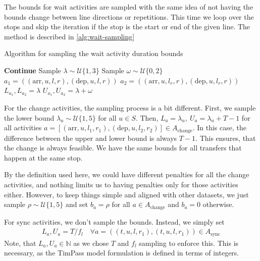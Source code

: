\documentclass[english, 12pt, a4paper, sci, utf8, a-2b, online]{aaltothesis}
\newcommand{\N}{\mathbb{N}}
\newcommand{\Async}{A_\text{sync}}
\newcommand{\unif}[1]{\mathcal{U}\{#1\}}
\begin{document}
The bounds for wait activities are sampled with the same idea of not having the bounds change between line directions or repetitions. This time we loop over the stops and skip the iteration if the stop is the start or end of the given line. The method is described in \cref{alg:wait-sampling}

\begin{algorithm}

    \caption{Algorithm for sampling the wait activity duration bounds}
    \label{alg:wait-sampling}
    \begin{algorithmic}
                    \State \textbf{Continue}
                \EndIf
                \State Sample $\lambda \sim \unif{1, 3}$ 
                \State Sample $\omega \sim \unif{0, 2}$ 
                    \State $a_1 = ((\text{arr}, u, l, r), (\text{dep}, u, l, r))$ 
                    \State $a_2 = ((\text{arr}, u, l_r, r), (\text{dep}, u, l_r, r))$ 
                    \State $L_{a_1}, L_{a_2} = \lambda$
                    \State $U_{a_1}, U_{a_2} = \lambda + \omega$
                \EndFor
            \EndFor
        \EndFor
    \end{algorithmic}
    
\end{algorithm}

For the change activities, the sampling process is a bit different. First, we sample the lower bound $\lambda_u \sim \unif{1, 5}$ for all $ u \in S$. Then, $L_a = \lambda_u,\ U_a = \lambda_u + T - 1$ for all activities $a = [(\text{arr}, u, l_1, r_1), (\text{dep}, u, l_2, r_2)] \in A_\text{change}$. In this case, the difference between the upper and lower bound is always $T-1$. This ensures, that the change is always feasible. We have the same bounds for all transfers that happen at the same stop.

By the definition used here, we could have different penalties for all the change activities, and nothing limits us to having penalties only for those activities either. However, to keep things simple and aligned with other datasets, we just sample $\rho \sim \unif{1, 5}$ and set $b_a = \rho$ for all $a \in A_\text{change}$ and $b_a = 0$ otherwise.

For sync activities, we don't sample the bounds. Instead, we simply set
\begin{align}
    L_a, U_a = T / f_l\quad  \forall a = ((t, u, l, r_1), (t, u, l, r_1)) \in \Async
\end{align}
Note, that $L_a, U_a \in \N$ as we chose $T$ and $f_l$ sampling to enforce this. This is necessary, as the TimPass model formulation is defined in terms of integers.
\end{document}
